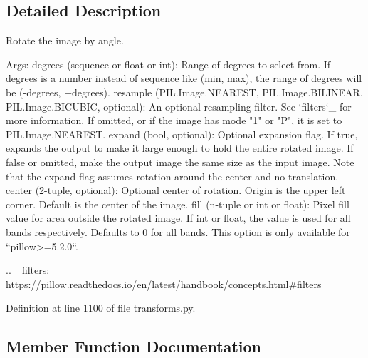\subsection{Detailed Description}
\begin{DoxyVerb}Rotate the image by angle.

Args:
    degrees (sequence or float or int): Range of degrees to select from.
        If degrees is a number instead of sequence like (min, max), the range of degrees
        will be (-degrees, +degrees).
    resample ({PIL.Image.NEAREST, PIL.Image.BILINEAR, PIL.Image.BICUBIC}, optional):
        An optional resampling filter. See `filters`_ for more information.
        If omitted, or if the image has mode "1" or "P", it is set to PIL.Image.NEAREST.
    expand (bool, optional): Optional expansion flag.
        If true, expands the output to make it large enough to hold the entire rotated image.
        If false or omitted, make the output image the same size as the input image.
        Note that the expand flag assumes rotation around the center and no translation.
    center (2-tuple, optional): Optional center of rotation.
        Origin is the upper left corner.
        Default is the center of the image.
    fill (n-tuple or int or float): Pixel fill value for area outside the rotated
        image. If int or float, the value is used for all bands respectively.
        Defaults to 0 for all bands. This option is only available for ``pillow>=5.2.0``.

.. _filters: https://pillow.readthedocs.io/en/latest/handbook/concepts.html#filters\end{DoxyVerb}
 

Definition at line 1100 of file transforms.\+py.



\subsection{Member Function Documentation}
\mbox{\label{classtorchvision_1_1transforms_1_1transforms_1_1RandomRotation_a92a652ef4404b753d4356108efc8c431}} 
